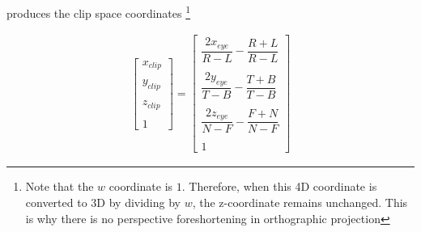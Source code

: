 \documentclass{article}
\begin{document}
    \noindent produces the clip space coordinates \footnote{Note that the $w$ coordinate is $1$. Therefore, when this 4D coordinate is converted to 3D by dividing by $w$, the z-coordinate remains unchanged. This is why there is no perspective foreshortening in orthographic projection} 


    \begin{align}
        \begin{bmatrix} x_{clip} \\ \\ y_{clip} \\ \\ z_{clip} \\ \\ 1 \end{bmatrix} = 
        \begin{bmatrix} \dfrac{2x_{eye}}{R-L} - \dfrac{R+L}{R-L} \\ \\ \dfrac{2y_{eye}}{T-B} - \dfrac{T+B}{T-B} \\ \\ \dfrac{2z_{eye}}{N-F} - \dfrac{F+N}{N-F} \\ \\ 1 \end{bmatrix}
    \end{align}

    

    \noindent 
    
\end{document}
